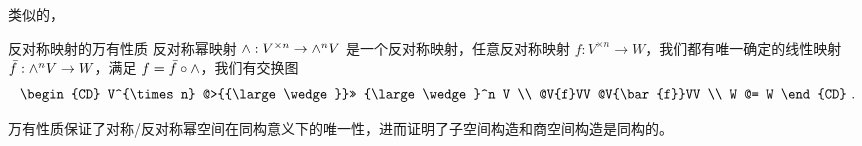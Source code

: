 类似的，
\begin{theorem}{反对称映射的万有性质}\label{the_vecSAS_1}
反对称幂映射 ${\large \wedge}: V^{\times n} \to {\large \wedge}^n V$ 是一个反对称映射，任意反对称映射 $f: V^{\times n} \to W$，我们都有唯一确定的线性映射 $\bar{f}: {\large \wedge}^n V \to W$，满足 $f = \bar{f} \circ {\large \wedge}$，我们有交换图
\begin{equation}
\begin{CD}
V^{\times n} @>{{\large \wedge}}>> {\large \wedge}^n V \\
@V{f}VV @V{\bar{f}}VV \\
W @= W
\end{CD}~.
\end{equation}
\end{theorem}

万有性质保证了对称/反对称幂空间在同构意义下的唯一性，进而证明了子空间构造和商空间构造是同构的。